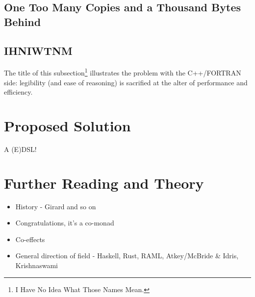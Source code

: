 \subsection{One Too Many Copies and a Thousand Bytes Behind}

\subsection{IHNIWTNM}
The title of this subsection\footnote{I Have No Idea What Those Names Mean.}
illustrates the problem with the C++/FORTRAN side: legibility (and ease of
reasoning) is sacrified at the alter of performance and efficiency.


\section{Proposed Solution}
A (E)DSL!


\section{Further Reading and Theory}\label{sec:further}
\begin{itemize}
    \item History - Girard and so on
    \item Congratulations, it's a co-monad
    \item Co-effects
    \item General direction of field - Haskell, Rust, RAML, Atkey/McBride \& Idris, Krishnaswami
\end{itemize}
